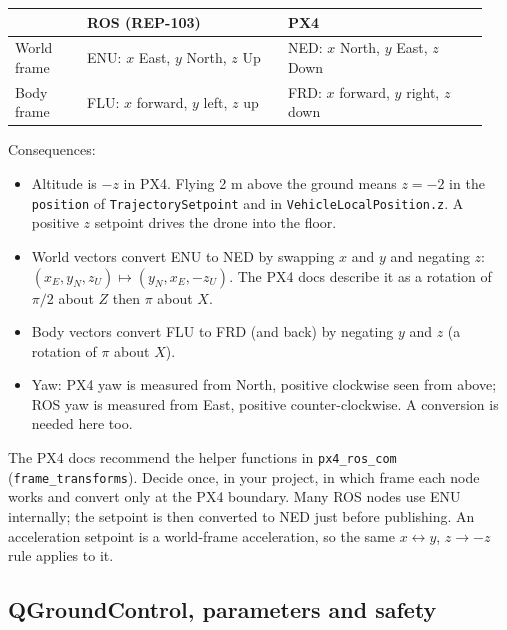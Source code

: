 \documentclass[11pt,a4paper]{article}
\begin{document}
\begin{longtable}{@{}p{0.145\linewidth} p{0.398\linewidth} p{0.398\linewidth}@{}}
	\toprule
	            & ROS (REP-103)                            & PX4               \\
	\midrule
	World frame & ENU: \(x\) East, \(y\) North, \(z\) Up   & NED: \(x\) North,
	\(y\) East, \(z\) Down                                                     \\
	Body frame  & FLU: \(x\) forward, \(y\) left, \(z\) up & FRD: \(x\)
	forward, \(y\) right, \(z\) down                                           \\
	\bottomrule
\end{longtable}

Consequences:

\begin{itemize}
	\item
	      Altitude is \(-z\) in PX4. Flying 2 m above the ground means \(z=-2\)
	      in the \texttt{position} of \texttt{TrajectorySetpoint} and in
	      \texttt{VehicleLocalPosition.z}. A positive \(z\) setpoint drives the
	      drone into the floor.
	\item
	      World vectors convert ENU to NED by swapping \(x\) and \(y\) and
	      negating \(z\): \((x_E,y_N,z_U)\mapsto(y_N,x_E,-z_U)\). The PX4 docs
	      describe it as a rotation of \(\pi/2\) about \(Z\) then \(\pi\) about
	      \(X\).
	\item
	      Body vectors convert FLU to FRD (and back) by negating \(y\) and \(z\)
	      (a rotation of \(\pi\) about \(X\)).
	\item
	      Yaw: PX4 yaw is measured from North, positive clockwise seen from
	      above; ROS yaw is measured from East, positive counter-clockwise. A
	      conversion is needed here too.
\end{itemize}

The PX4 docs recommend the helper functions in \texttt{px4\_ros\_com}
(\texttt{frame\_transforms}). Decide once, in your project, in which
frame each node works and convert only at the PX4 boundary. Many ROS
nodes use ENU internally; the setpoint is then converted to NED just
before publishing. An acceleration setpoint is a world-frame
acceleration, so the same \(x\leftrightarrow y\), \(z\to-z\) rule
applies to it.

\subsection{QGroundControl, parameters and
	safety}\label{qgroundcontrol-parameters-and-safety}
\end{document}
